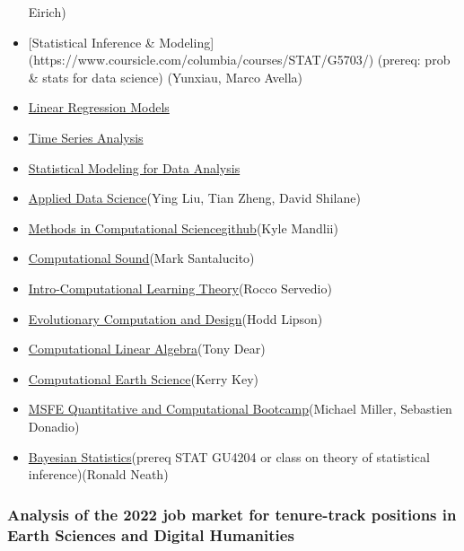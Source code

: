 \documentclass[%
  ,
  article,
  ,
  oneside
  ]{memoir}
\begin{document}
\begin{itemize}
  Eirich)
\item
  {[}Statistical Inference \& Modeling{]}
  (https://www.coursicle.com/columbia/courses/STAT/G5703/) (prereq: prob
  \& stats for data science) (Yunxiau, Marco Avella)
\item
  \href{https://www.coursicle.com/barnard/courses/STAT/GU4205/}{Linear
  Regression Models}
\item
  \href{https://www.coursicle.com/barnard/courses/STAT/GU4221/}{Time
  Series Analysis}
\item
  \href{http://www.stat.columbia.edu/~madigan/G6102/}{Statistical
  Modeling for Data Analysis}
\item
  \href{https://www.coursicle.com/columbia/courses/STAT/W4243/}{Applied
  Data Science}(Ying Liu, Tian Zheng, David Shilane)
\item
  \href{http://www.columbia.edu/cu/bulletin/uwb/subj/APMA/E4302-20213-001/}{Methods
  in Computational
  Science}\href{https://github.com/mandli/methods-in-computational-science}{github}(Kyle
  Mandlii)
\item
  \href{https://www.marksantolucito.com/COMS3430/fall2021/}{Computational
  Sound}(Mark Santalucito)
\item
  \href{http://www.cs.columbia.edu/~cs4252/}{Intro-Computational
  Learning Theory}(Rocco Servedio)
\item
  \href{http://www.columbia.edu/cu/bulletin/uwb-test/subj/MECS/E4510-20213-001/}{Evolutionary
  Computation and Design}(Hodd Lipson)
\item
  \href{https://tonydear.github.io/teaching/coms3251}{Computational
  Linear Algebra}(Tony Dear)
\item
  \href{https://www.coursicle.com/columbia/courses/EESC/W3400/}{Computational
  Earth Science}(Kerry Key)
\item
  \href{https://www.coursicle.com/columbia/courses/IEOR/E4799/}{MSFE
  Quantitative and Computational Bootcamp}(Michael Miller, Sebastien
  Donadio)
\item
  \href{https://www.coursicle.com/columbia/courses/STAT/W4224/}{Bayesian
  Statistics}(prereq STAT GU4204 or class on theory of statistical
  inference)(Ronald Neath)
\end{itemize}

\hypertarget{analysis-of-the-2022-job-market-for-tenure-track-positions-in-earth-sciences-and-digital-humanities}{%
\subsubsection{Analysis of the 2022 job market for tenure-track
positions in Earth Sciences and Digital
Humanities}\label{analysis-of-the-2022-job-market-for-tenure-track-positions-in-earth-sciences-and-digital-humanities}}
\end{document}
